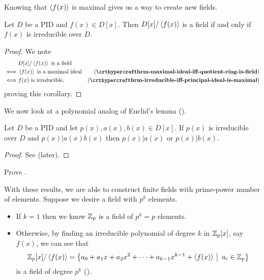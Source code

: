 \newpage

Knowing that $\left\langle f(x)\right\rangle$ is maximal gives us a way to create new fields.

\begin{corollary}\label{corollary-polynomial-quotient-by-principal-ideal-is-field-iff-polynomial-irreducible}
    Let $D$ be a PID and $f(x) \in D[x]$. Then $D[x]/\left\langle f(x)\right\rangle$ is a field if and only if $f(x)$ is irreducible over $D$.
\end{corollary}
\begin{proof}
    We note
    \begin{align*}
        &D[x]/\princ{f(x)} \text{ is a field}\\
        \iff&\princ{f(x)} \text{ is a maximal ideal} & (\myref{thrm-maximal-ideal-iff-quotient-ring-is-field})\\
        \iff&f(x) \text{ is irreducible,} & (\myref{thrm-irreducible-iff-principal-ideal-is-maximal})
    \end{align*}
    proving this corollary.
\end{proof}

We now look at a polynomial analog of Euclid's lemma ().

\begin{corollary}\label{corollary-irreducible-polynomial-division-rule}
    Let $D$ be a PID and let $p(x), a(x), b(x) \in D[x]$. If $p(x)$ is irreducible over $D$ and $p(x) \vert a(x)b(x)$ then $p(x) \vert a(x)$ or $p(x) \vert b(x)$.
\end{corollary}
\begin{proof}
    See  (later).
\end{proof}

\begin{exercise}\label{exercise-irreducible-polynomial-division-rule}
    Prove .
\end{exercise}

With these results, we are able to construct finite fields with prime-power number of elements. Suppose we desire a field with $p^k$ elements.
\begin{itemize}
    \item If $k = 1$ then we know $\mathbb{Z}_p$ is a field of $p^k = p$ elements.
    \item Otherwise, by finding an irreducible polynomial of degree $k$ in $\mathbb{Z}_p[x]$, say $f(x)$, we can see that
    \[
        \Z_p[x]/\princ{f(x)} = \left\{a_0 + a_1x + a_2x^2 + \cdots + a_{k-1}x^{k-1} + \princ{f(x)} \vert a_i \in \Z_p\right\}
    \]
    is a field of degree $p^k$ ().
\end{itemize}

